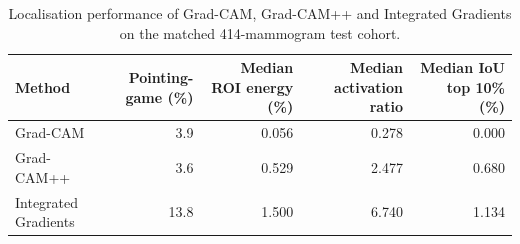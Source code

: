 \begin{table}[htbp]
    \centering
    \caption{Localisation performance of Grad-CAM, Grad-CAM++ and
    Integrated Gradients on the matched 414-mammogram test cohort.}
    \label{tab:rq2_xai_method_comparison}
    \begin{tabular}{lrrrr}
        \toprule
        Method &
        Pointing-game (\%) &
        Median ROI energy (\%) &
        Median activation ratio &
        Median IoU top 10\% (\%) \\
        \midrule
        Grad-CAM & 3.9 & 0.056 & 0.278 & 0.000 \\
        Grad-CAM++ & 3.6 & 0.529 & 2.477 & 0.680 \\
        Integrated Gradients & 13.8 & 1.500 & 6.740 & 1.134 \\
        \bottomrule
    \end{tabular}
\end{table}
